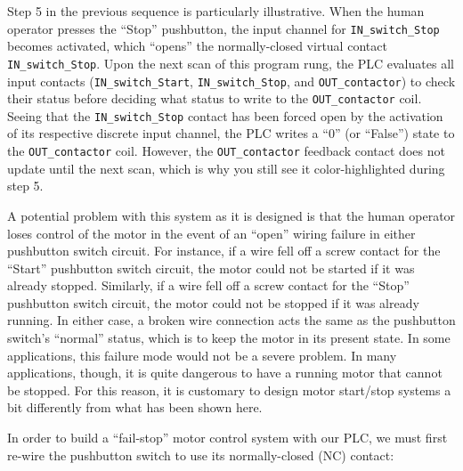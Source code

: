 Step 5 in the previous sequence is particularly illustrative.  When the human operator presses the ``Stop'' pushbutton, the input channel for \texttt{IN\_switch\_Stop} becomes activated, which ``opens'' the normally-closed virtual contact \texttt{IN\_switch\_Stop}.  Upon the next scan of this program rung, the PLC evaluates all input contacts (\texttt{IN\_switch\_Start}, \texttt{IN\_switch\_Stop}, and \texttt{OUT\_contactor}) to check their status before deciding what status to write to the \texttt{OUT\_contactor} coil.  Seeing that the \texttt{IN\_switch\_Stop} contact has been forced open by the activation of its respective discrete input channel, the PLC writes a ``0'' (or ``False'') state to the \texttt{OUT\_contactor} coil.  However, the \texttt{OUT\_contactor} feedback contact does not update until the next scan, which is why you still see it color-highlighted during step 5.

\vskip 10pt

A potential problem with this system as it is designed is that the human operator loses control of the motor in the event of an ``open'' wiring failure in either pushbutton switch circuit.  For instance, if a wire fell off a screw contact for the ``Start'' pushbutton switch circuit, the motor could not be started if it was already stopped.  Similarly, if a wire fell off a screw contact for the ``Stop'' pushbutton switch circuit, the motor could not be stopped if it was already running.  In either case, a broken wire connection acts the same as the pushbutton switch's ``normal'' status, which is to keep the motor in its present state.  In some applications, this failure mode would not be a severe problem.  In many applications, though, it is quite dangerous to have a running motor that cannot be stopped.  For this reason, it is customary to design motor start/stop systems a bit differently from what has been shown here.

\filbreak

In order to build a ``fail-stop'' motor control system with our PLC, we must first re-wire the pushbutton switch to use its normally-closed (NC) contact:

